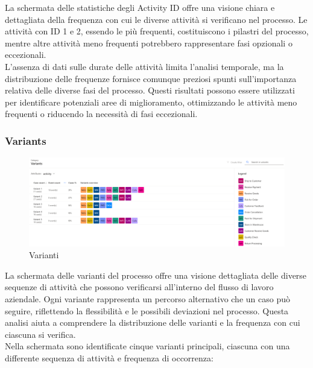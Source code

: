 \documentclass{article}
\begin{document}
La schermata delle statistiche degli Activity ID offre una visione chiara e dettagliata della frequenza con cui le diverse attività si verificano nel processo. Le attività con ID 1 e 2, essendo le più frequenti, costituiscono i pilastri del processo, mentre altre attività meno frequenti potrebbero rappresentare fasi opzionali o eccezionali.\\
L'assenza di dati sulle durate delle attività limita l'analisi temporale, ma la distribuzione delle frequenze fornisce comunque preziosi spunti sull'importanza relativa delle diverse fasi del processo. Questi risultati possono essere utilizzati per identificare potenziali aree di miglioramento, ottimizzando le attività meno frequenti o riducendo la necessità di fasi eccezionali.

\subsubsection{Variants}
\begin{figure}[H]
    \centering
    \includegraphics[width=\textwidth]{imgMicrosoft/PrimaSimulazione/VariantsSimulazione1.png}
    \caption{Varianti}
    \label{fig:variants}
\end{figure}
La schermata delle varianti del processo offre una visione dettagliata delle diverse sequenze di attività che possono verificarsi all'interno del flusso di lavoro aziendale. Ogni variante rappresenta un percorso alternativo che un caso può seguire, riflettendo la flessibilità e le possibili deviazioni nel processo. Questa analisi aiuta a comprendere la distribuzione delle varianti e la frequenza con cui ciascuna si verifica.\\
Nella schermata sono identificate cinque varianti principali, ciascuna con una differente sequenza di attività e frequenza di occorrenza:
\end{document}
